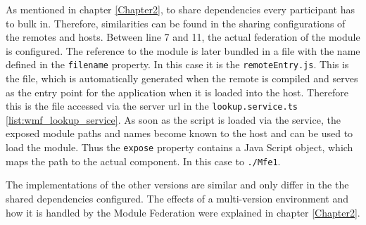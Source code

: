 As mentioned in chapter \ref{Chapter2}, to share dependencies every participant has to bulk in. Therefore, similarities can be found in the sharing configurations of the remotes and hosts. 
Between line 7 and 11, the actual federation of the module is configured. The reference to the module is later bundled in a file with the name defined in the \texttt{filename} property. In this case it is the \texttt{remoteEntry.js}.
This is the file, which is automatically generated when the remote is compiled and serves as the entry point for the application when it is loaded into the host. Therefore this is the file accessed via the server url in the \texttt{lookup.service.ts} \ref{list:wmf_lookup_service}.
As soon as the script is loaded via the service, the exposed module paths and names become known to the host and can be used to load the module. Thus the \texttt{expose} property contains a Java Script object, which maps the path to the actual component. In this case to \texttt{./Mfe1}.\cite{wmf_concepts}

The implementations of the other versions are similar and only differ in the the shared dependencies configured. The effects of a multi-version environment and how it is handled by the Module Federation were explained in chapter \ref{Chapter2}.